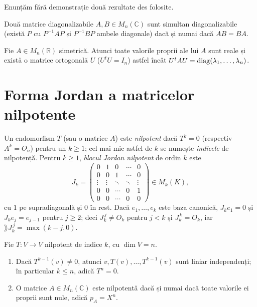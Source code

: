 Enunțăm fără demonstrație două rezultate des folosite.

\begin{teorema}\label{teo:diagsimultana}
Două matrice diagonalizabile $A,B\in M_n(\mathbb{C})$ sunt simultan diagonalizabile (există $P$ cu $P^{-1}AP$ și $P^{-1}BP$ ambele diagonale) dacă și numai dacă $AB=BA$.
\end{teorema}

\begin{teorema}\label{teo:spectrala}
Fie $A\in M_n(\mathbb{R})$ simetrică. Atunci toate valorile proprii ale lui $A$ sunt reale și există o matrice ortogonală $U$ ($U^tU=I_n$) astfel încât $U^tAU=\operatorname{diag}(\lambda_1,\dots,\lambda_n)$.
\end{teorema}

\section{Forma Jordan a matricelor nilpotente}

\begin{definitie}
Un endomorfism $T$ (sau o matrice $A$) este \emph{nilpotent} dacă $T^k=0$ (respectiv $A^k=O_n$) pentru un $k\ge1$; cel mai mic astfel de $k$ se numește \emph{indicele} de nilpotență. Pentru $k\ge1$, \emph{blocul Jordan nilpotent} de ordin $k$ este
\[
J_k=\begin{pmatrix}
0&1&0&\cdots&0\\
0&0&1&\cdots&0\\
\vdots&\vdots&\ddots&\ddots&\vdots\\
0&0&\cdots&0&1\\
0&0&\cdots&0&0
\end{pmatrix}\in M_k(K),
\]
cu $1$ pe supradiagonală și $0$ în rest. Dacă $e_1,\dots,e_k$ este baza canonică, $J_ke_1=0$ și $J_ke_j=e_{j-1}$ pentru $j\ge2$; deci $J_k^{\,j}\neq O_k$ pentru $j<k$ și $J_k^{\,k}=O_k$, iar $\rang J_k^{\,j}=\max(k-j,0)$.
\end{definitie}

\begin{propozitie}\label{prop:nilpotent}
Fie $T:V\to V$ nilpotent de indice $k$, cu $\dim V=n$.
\begin{enumerate}
\item Dacă $T^{k-1}(v)\neq0$, atunci $v,T(v),\dots,T^{k-1}(v)$ sunt liniar independenți; în particular $k\le n$, adică $T^n=0$.
\item O matrice $A\in M_n(\mathbb{C})$ este nilpotentă dacă și numai dacă toate valorile ei proprii sunt nule, adică $p_A=X^n$.
\end{enumerate}
\end{propozitie}

